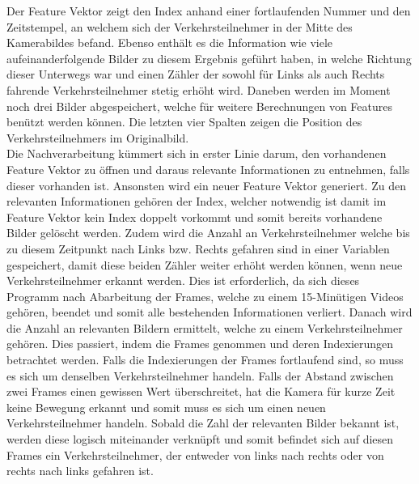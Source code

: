 \setlength\tabcolsep{0pt}

Der Feature Vektor zeigt den Index anhand einer fortlaufenden Nummer und den Zeitstempel, an welchem sich der Verkehrsteilnehmer in der Mitte des Kamerabildes befand. Ebenso enthält es die Information wie viele aufeinanderfolgende Bilder zu diesem Ergebnis geführt haben, in welche Richtung dieser Unterwegs war und einen Zähler der sowohl für Links als auch Rechts fahrende Verkehrsteilnehmer stetig erhöht wird. Daneben werden im Moment noch drei Bilder abgespeichert, welche für weitere Berechnungen von Features benützt werden können. Die letzten vier Spalten zeigen die Position des Verkehrsteilnehmers im Originalbild.\\
Die Nachverarbeitung kümmert sich in erster Linie darum, den vorhandenen Feature Vektor zu öffnen und daraus relevante Informationen zu entnehmen, falls dieser vorhanden ist. Ansonsten wird ein neuer Feature Vektor generiert. Zu den relevanten Informationen gehören der Index, welcher notwendig ist damit im Feature Vektor kein Index doppelt vorkommt und somit bereits vorhandene Bilder gelöscht werden. Zudem wird die Anzahl an Verkehrsteilnehmer welche bis zu diesem Zeitpunkt nach Links bzw. Rechts gefahren sind in einer Variablen gespeichert, damit diese beiden Zähler weiter erhöht werden können, wenn neue Verkehrsteilnehmer erkannt werden. Dies ist erforderlich, da sich dieses Programm nach Abarbeitung der Frames, welche zu einem 15-Minütigen Videos gehören, beendet und somit alle bestehenden Informationen verliert. Danach wird die Anzahl an relevanten Bildern ermittelt, welche zu einem Verkehrsteilnehmer gehören. Dies passiert, indem die Frames genommen und deren Indexierungen betrachtet werden. Falls die Indexierungen der Frames fortlaufend sind, so muss es sich um denselben Verkehrsteilnehmer handeln. Falls der Abstand zwischen zwei Frames einen gewissen Wert überschreitet, hat die Kamera für kurze Zeit keine Bewegung erkannt und somit muss es sich um einen neuen Verkehrsteilnehmer handeln. Sobald die Zahl der relevanten Bilder bekannt ist, werden diese logisch miteinander verknüpft und somit befindet sich auf diesen Frames ein Verkehrsteilnehmer, der entweder von links nach rechts oder von rechts nach links gefahren ist.\\
